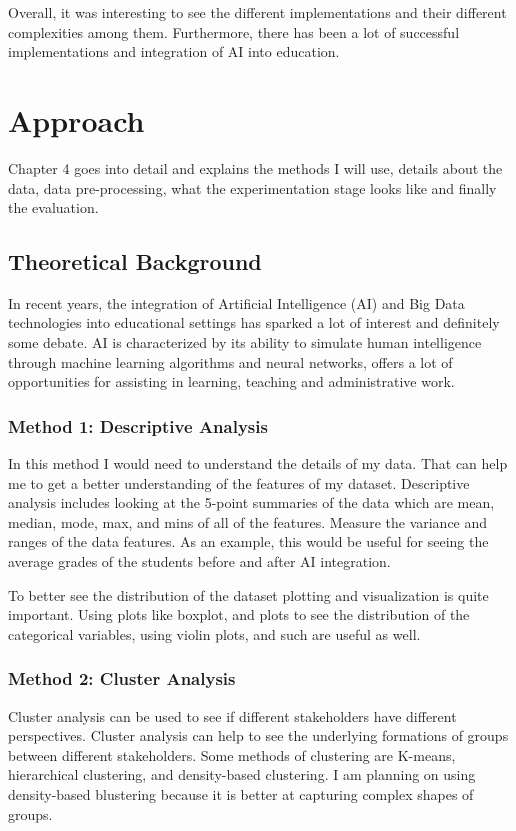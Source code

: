 \documentclass{imc-inf}
\begin{document}
Overall, it was interesting to see the different implementations and their different complexities among them. Furthermore, there has been a lot of successful implementations and integration of AI into education. 










\chapter{Approach}
Chapter 4 goes into detail and explains the methods I will use, details about the data, data pre-processing, what the experimentation stage looks like and finally the evaluation. 


\section{Theoretical Background }
In recent years, the integration of Artificial Intelligence (AI) and Big Data technologies into educational settings has sparked a lot of interest and definitely some debate. AI is characterized by its ability to simulate human intelligence through machine learning algorithms and neural networks, offers a lot of opportunities for assisting in learning, teaching and administrative work.

\subsection{Method 1: Descriptive Analysis}
In this method I would need to understand the details of my data. That can help me to get a better understanding of the features of my dataset. Descriptive analysis includes looking at the 5-point summaries of the data which are mean, median, mode, max, and mins of all of the features. Measure the variance and ranges of the data features. As an example, this would be useful for seeing the average grades of the students before and after AI integration. 

To better see the distribution of the dataset plotting and visualization is quite important. Using plots like boxplot, and plots to see the distribution of the categorical variables, using violin plots, and such are useful as well. 

\subsection{Method 2: Cluster Analysis}
Cluster analysis can be used to see if different stakeholders have different perspectives. Cluster analysis can help to see the underlying formations of groups between different stakeholders. Some methods of clustering are K-means, hierarchical clustering, and density-based clustering. I am planning on using density-based blustering because it is better at capturing complex shapes of groups. 
\end{document}
